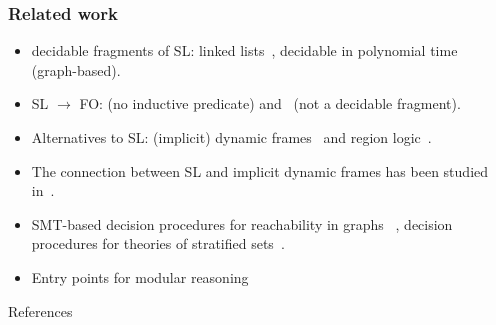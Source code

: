 \documentclass{beamer}
\begin{document}
\begin{frame}
  \frametitle{Related work}
{\small
  \begin{itemize}
  \item decidable fragments of SL: linked lists~\cite{BerdineETAL04DecidableFragmentSeparationLogic}, decidable in polynomial time~\cite{CooketALFragmentSepLog} (graph-based).

\item SL $\rightarrow$ FO: \cite{Calcagno05fromseparation} (no inductive predicate) and~\cite{bobot12icfem} (not a decidable fragment).

\item Alternatives to SL: (implicit) dynamic frames~\cite{DBLP:journals/fac/Kassios11} and region logic~\cite{DBLP:conf/ecoop/BanerjeeNR08,DBLP:conf/vmcai/RosenbergBN12}.
\item The connection between SL and implicit dynamic frames has been studied in~\cite{DBLP:journals/corr/abs-1203-6859}.

\item SMT-based decision procedures for reachability in graphs~\cite{DBLP:conf/popl/LahiriQ08, WiesMK11, TotlaWies13CompleteInsterpolation}
, decision procedures for theories of stratified sets~\cite{Zarba04CombiningSetsElements}.
\item Entry points for modular reasoning \cite{poplepr}

\end{itemize}
}
\end{frame}

\begin{frame}[allowframebreaks]{References}
  {\tiny
  
  
  }
\end{frame}
\end{document}
